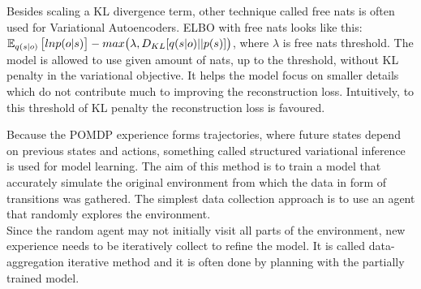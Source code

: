 Besides scaling a KL divergence term, other technique called free nats \cite{Algo.FreeNats} is often used for Variational Autoencoders. ELBO with free nats looks like this: $\operatorname{\mathbb{E}}_{q(s|o)}\big[ ln p(o|s) \big] - max\big( \lambda, D_{KL}[q(s|o)||p(s)] \big)$, where $\lambda$ is free nats threshold. The model is allowed to use given amount of nats, up to the threshold, without KL penalty in the variational objective. It helps the model focus on smaller details which do not contribute much to improving the reconstruction loss. Intuitively, to this threshold of KL penalty the reconstruction loss is favoured.

Because the POMDP experience forms trajectories, where future states depend on previous states and actions, something called structured variational inference is used for model learning. The aim of this method is to train a model that accurately simulate the original environment from which the data in form of transitions was gathered. The simplest data collection approach is to use an agent that randomly explores the environment. \\
Since the random agent may not initially visit all parts of the environment, new experience needs to be iteratively collect to refine the model. It is called data-aggregation iterative method and it is often done by planning with the partially trained model.

